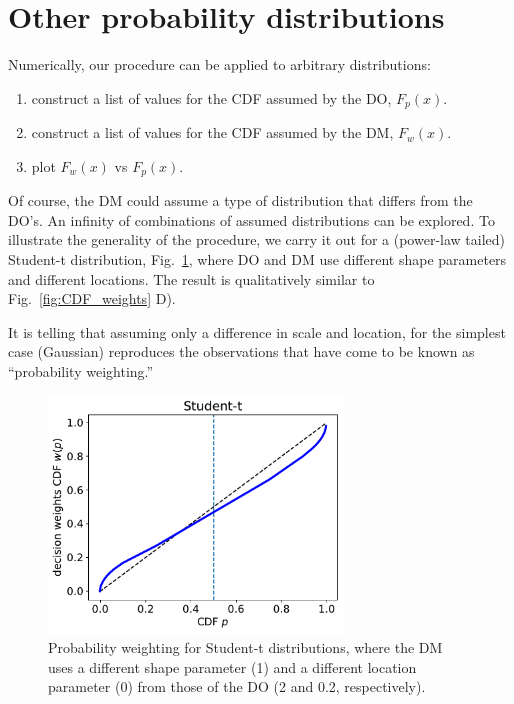 \documentclass[%
	11pt,
	abstract=true,	
	bibliography=oldstyle					%
]{scrartcl}
\newcommand{\flabel}[1]{\label{fig:#1}}
\newcommand{\fref}[1]{Fig.~\ref{fig:#1}}
\numberwithin{equation}{section}
\begin{document}
\section{Other probability distributions}
Numerically, our procedure can be applied to arbitrary distributions: 
\begin{enumerate}
\item
construct a list of values for the CDF assumed by the DO, $F_p(x)$.
\item
construct a list of values for the CDF assumed by the DM, $F_w(x)$.
\item
plot $F_w(x)$ vs $F_p(x)$.
\end{enumerate}
Of course, the DM could assume a type of distribution that differs from the DO's. An infinity of combinations of assumed distributions can be explored. To illustrate the generality of the procedure, we carry it out for a (power-law tailed) Student-t distribution, \fref{other_CDFs}, where DO and DM use different shape parameters and different locations. The result is qualitatively similar to \fref{CDF_weights} D). 

It is telling that assuming only a difference in scale and location, for the simplest case (Gaussian) reproduces the observations that have come to be known as ``probability weighting.''

\begin{figure}
\centering
\includegraphics[width=0.7\textwidth]{./figs/Student-t.pdf}
\caption{Probability weighting for Student-t distributions, where the DM uses a different shape parameter (1) and a different location parameter (0) from those of the DO (2 and 0.2, respectively).}
\flabel{other_CDFs}
\end{figure}

\clearpage
%
\printbibliography
\end{document}
